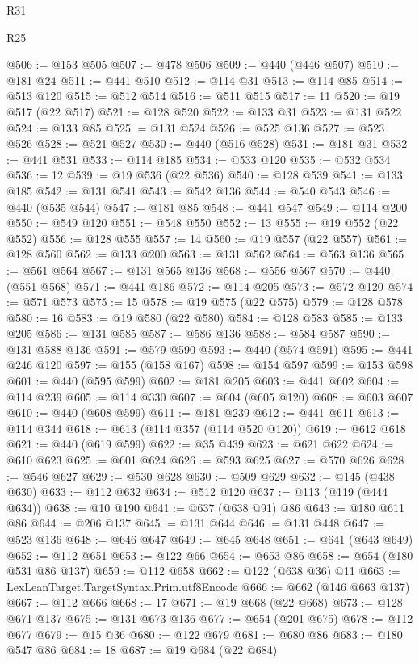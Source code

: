 \begin{lexlean}{R31}
\begin{lexlean}{R25}
\begin{coremodule}
{{{{{{{{{{{{{{{{{{{{{{{{{{{{{{{{{{{{{{{{{{{{{{{{{{{{{{{{{{{{{{{{{{{{{{{{{{{{{{{{{{{{{{{{{{{{{{{{{{{{{{{{{{{{{{{{{{{{{{{{{{{{{{{{{{{{{{{{{{{{{{{{{{{{{{{{{{{{{{{{{{{{{{{{{{{{{{{{{{{{{{{{{{{{{{{{{{{{{{{@506 := @153 @505
@507 := @478 @506
@509 := @440 (@446 @507)
@510 := @181 @24
@511 := @441 @510
@512 := @114 @31
@513 := @114 @85
@514 := @513 @120
@515 := @512 @514
@516 := @511 @515
@517 := 11
@520 := @19 @517 (@22 @517)
@521 := @128 @520
@522 := @133 @31
@523 := @131 @522
@524 := @133 @85
@525 := @131 @524
@526 := @525 @136
@527 := @523 @526
@528 := @521 @527
@530 := @440 (@516 @528)
@531 := @181 @31
@532 := @441 @531
@533 := @114 @185
@534 := @533 @120
@535 := @532 @534
@536 := 12
@539 := @19 @536 (@22 @536)
@540 := @128 @539
@541 := @133 @185
@542 := @131 @541
@543 := @542 @136
@544 := @540 @543
@546 := @440 (@535 @544)
@547 := @181 @85
@548 := @441 @547
@549 := @114 @200
@550 := @549 @120
@551 := @548 @550
@552 := 13
@555 := @19 @552 (@22 @552)
@556 := @128 @555
@557 := 14
@560 := @19 @557 (@22 @557)
@561 := @128 @560
@562 := @133 @200
@563 := @131 @562
@564 := @563 @136
@565 := @561 @564
@567 := @131 @565 @136
@568 := @556 @567
@570 := @440 (@551 @568)
@571 := @441 @186
@572 := @114 @205
@573 := @572 @120
@574 := @571 @573
@575 := 15
@578 := @19 @575 (@22 @575)
@579 := @128 @578
@580 := 16
@583 := @19 @580 (@22 @580)
@584 := @128 @583
@585 := @133 @205
@586 := @131 @585
@587 := @586 @136
@588 := @584 @587
@590 := @131 @588 @136
@591 := @579 @590
@593 := @440 (@574 @591)
@595 := @441 @246 @120
@597 := @155 (@158 @167)
@598 := @154 @597
@599 := @153 @598
@601 := @440 (@595 @599)
@602 := @181 @205
@603 := @441 @602
@604 := @114 @239
@605 := @114 @330
@607 := @604 (@605 @120)
@608 := @603 @607
@610 := @440 (@608 @599)
@611 := @181 @239
@612 := @441 @611
@613 := @114 @344
@618 := @613 (@114 @357 (@114 @520 @120))
@619 := @612 @618
@621 := @440 (@619 @599)
@622 := @35 @439
@623 := @621 @622
@624 := @610 @623
@625 := @601 @624
@626 := @593 @625
@627 := @570 @626
@628 := @546 @627
@629 := @530 @628
@630 := @509 @629
@632 := @145 (@438 @630)
@633 := @112 @632
@634 := @512 @120
@637 := @113 (@119 (@444 @634))
@638 := @10 @190
@641 := @637 (@638 @91) @86
@643 := @180 @611 @86
@644 := @206 @137
@645 := @131 @644
@646 := @131 @448
@647 := @523 @136
@648 := @646 @647
@649 := @645 @648
@651 := @641 (@643 @649)
@652 := @112 @651
@653 := @122 @66
@654 := @653 @86
@658 := @654 (@180 @531 @86 @137)
@659 := @112 @658
@662 := @122 (@638 @36) @11
@663 := LexLeanTarget.TargetSyntax.Prim.utf8Encode
@666 := @662 (@146 @663 @137)
@667 := @112 @666
@668 := 17
@671 := @19 @668 (@22 @668)
@673 := @128 @671 @137
@675 := @131 @673 @136
@677 := @654 (@201 @675)
@678 := @112 @677
@679 := @15 @36
@680 := @122 @679
@681 := @680 @86
@683 := @180 @547 @86
@684 := 18
@687 := @19 @684 (@22 @684)
}}}}}}}}}}}}}}}}}}}}}}}}}}}}}}}}}}}}}}}}}}}}}}}}}}}}}}}}}}}}}}}}}}}}}}}}}}}}}}}}}}}}}}}}}}}}}}}}}}}}}}}}}}}}}}}}}}}}}}}}}}}}}}}}}}}}}}}}}}}}}}}}}}}}}}}}}}}}}}}}}}}}}}}}}}}}}}}}}}}}}}}}}}}}}}}}}}}}}}}
\end{coremodule}
\end{lexlean}
\end{lexlean}
